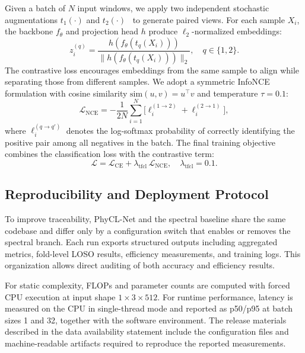 \documentclass[jec]{acnsart}
\begin{document}
Given a batch of $N$ input windows, we apply two independent stochastic augmentations $t_1(\cdot)$ and $t_2(\cdot)$~\cite{Iwana2021DataAugmentation} to generate paired views. For each sample $X_i$, the backbone $f_\theta$ and projection head $h$ produce $\ell_2$-normalized embeddings:
\begin{equation}
\label{eq:tfcl_embed}
z_i^{(q)}=\frac{h(f_\theta(t_q(X_i)))}{\|h(f_\theta(t_q(X_i)))\|_2}, \quad q\in\{1,2\}.
\end{equation}
The contrastive loss encourages embeddings from the same sample to align while separating those from different samples. We adopt a symmetric InfoNCE formulation with cosine similarity $\mathrm{sim}(u,v) = u^\top v$ and temperature $\tau = 0.1$:
\begin{equation}
\label{eq:tfcl_infonce}
\mathcal{L}_{\mathrm{NCE}} = -\frac{1}{2N}\sum_{i=1}^{N}\bigl[\ell_i^{(1\to2)} + \ell_i^{(2\to1)}\bigr],
\end{equation}
where $\ell_i^{(q\to q')}$ denotes the log-softmax probability of correctly identifying the positive pair among all negatives in the batch. The final training objective combines the classification loss with the contrastive term:
\begin{equation}
\label{eq:tfcl_total}
\mathcal{L} = \mathcal{L}_{\mathrm{CE}}+\lambda_{\mathrm{tfcl}}\,\mathcal{L}_{\mathrm{NCE}}, \quad \lambda_{\mathrm{tfcl}}= 0.1.
\end{equation}

\subsection{Reproducibility and Deployment Protocol}
To improve traceability, PhyCL-Net and the spectral baseline share the same codebase and differ only by a configuration switch that enables or removes the spectral branch. Each run exports structured outputs including aggregated metrics, fold-level LOSO results, efficiency measurements, and training logs. This organization allows direct auditing of both accuracy and efficiency results.

For static complexity, FLOPs and parameter counts are computed with forced CPU execution at input shape $1 \times 3 \times 512$. For runtime performance, latency is measured on the CPU in single-thread mode and reported as p50/p95 at batch sizes 1 and 32, together with the software environment. The release materials described in the data availability statement include the configuration files and machine-readable artifacts required to reproduce the reported measurements.
\end{document}
